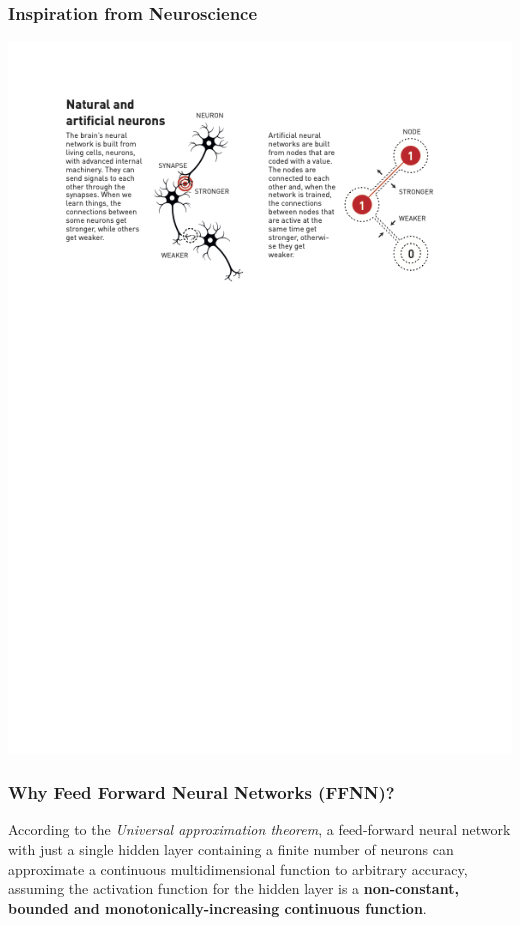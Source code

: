 \documentclass{beamer}
\begin{document}
\begin{frame}
\frametitle{Inspiration from Neuroscience}

\vspace{6mm}

\centerline{\includegraphics[width=1.0\linewidth]{figures/neuronandnn.png}}

\vspace{6mm}
\end{frame}

\begin{frame}
\frametitle{Why Feed Forward Neural Networks (FFNN)?}

According to the \emph{Universal approximation theorem}, a feed-forward
neural network with just a single hidden layer containing a finite
number of neurons can approximate a continuous multidimensional
function to arbitrary accuracy, assuming the activation function for
the hidden layer is a \textbf{non-constant, bounded and
monotonically-increasing continuous function}.
\end{frame}
\end{document}
